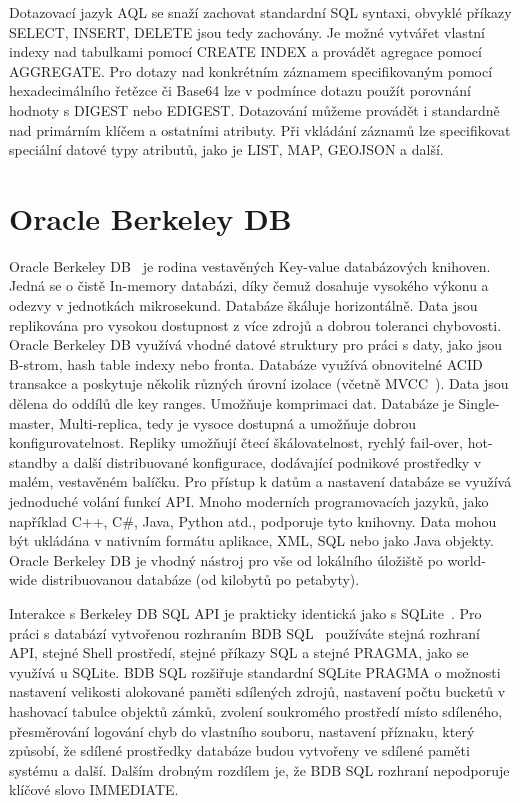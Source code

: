 \documentclass[czech,master,dept460,male,csharp,cpdeclaration]{diploma}
\begin{document}
	Dotazovací jazyk AQL se snaží zachovat standardní SQL syntaxi, obvyklé příkazy SELECT, INSERT, DELETE jsou tedy zachovány. Je možné vytvářet vlastní indexy nad tabulkami pomocí CREATE INDEX a provádět agregace pomocí AGGREGATE. Pro dotazy nad konkrétním záznamem specifikovaným pomocí hexadecimálního řetězce či Base64 lze v podmínce dotazu použít porovnání hodnoty s DIGEST nebo EDIGEST. Dotazování můžeme provádět i standardně nad primárním klíčem a ostatními atributy. Při vkládání záznamů lze specifikovat speciální datové typy atributů, jako je LIST, MAP, GEOJSON a další.
	
	\section{Oracle Berkeley DB}
	
	Oracle Berkeley DB~\cite{berkeleydb} je rodina vestavěných Key-value databázových knihoven. Jedná se o čistě In-memory databázi, díky čemuž dosahuje vysokého výkonu a odezvy v jednotkách mikrosekund. Databáze škáluje horizontálně. Data jsou replikována pro vysokou dostupnost z více zdrojů a dobrou toleranci chybovosti. Oracle Berkeley DB využívá vhodné datové struktury pro práci s daty, jako jsou B-strom, hash table indexy nebo fronta. Databáze využívá obnovitelné ACID transakce a poskytuje několik různých úrovní izolace (včetně MVCC~\cite{mvcc}). Data jsou dělena do oddílů dle key ranges. Umožňuje komprimaci dat. Databáze je Single-master, Multi-replica, tedy je vysoce dostupná a umožňuje dobrou konfigurovatelnost. Repliky umožňují čtecí škálovatelnost, rychlý fail-over, hot-standby a další distribuované konfigurace, dodávající podnikové prostředky v malém, vestavěném balíčku. Pro přístup k datům a nastavení databáze se využívá jednoduché volání funkcí API. Mnoho moderních programovacích jazyků, jako například C++, C\#, Java, Python atd., podporuje tyto knihovny. Data mohou být ukládána v nativním formátu aplikace, XML, SQL nebo jako Java objekty. Oracle Berkeley DB je vhodný nástroj pro vše od lokálního úložiště po world-wide distribuovanou databáze (od kilobytů po petabyty).
	
	Interakce s Berkeley DB SQL API je prakticky identická jako s SQLite~\cite{sqlite}. Pro práci s databází vytvořenou rozhraním BDB SQL~\cite{bdbsql} používáte stejná rozhraní API, stejné Shell prostředí, stejné příkazy SQL a stejné PRAGMA, jako se využívá u SQLite. BDB SQL rozšiřuje standardní SQLite PRAGMA o možnosti nastavení velikosti alokované paměti sdílených zdrojů, nastavení počtu bucketů v hashovací tabulce objektů zámků, zvolení soukromého prostředí místo sdíleného, přesměrování logování chyb do vlastního souboru, nastavení příznaku, který způsobí, že sdílené prostředky databáze budou vytvořeny ve sdílené paměti systému a další. Dalším drobným rozdílem je, že BDB SQL rozhraní nepodporuje klíčové slovo IMMEDIATE.
	
\end{document}
